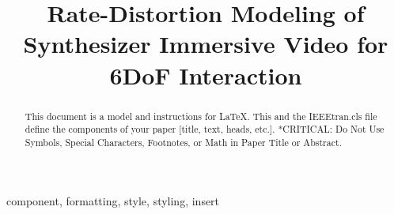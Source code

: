 \documentclass[conference]{IEEEtran}
\begin{document}
\title{Rate-Distortion Modeling of Synthesizer Immersive Video for 6DoF Interaction}

\author{
}

\maketitle

\begin{abstract}
This document is a model and instructions for \LaTeX.
This and the IEEEtran.cls file define the components of your paper [title, text, heads, etc.]. *CRITICAL: Do Not Use Symbols, Special Characters, Footnotes, 
or Math in Paper Title or Abstract.
\end{abstract}

\begin{IEEEkeywords}
component, formatting, style, styling, insert
\end{IEEEkeywords}











\end{document}
